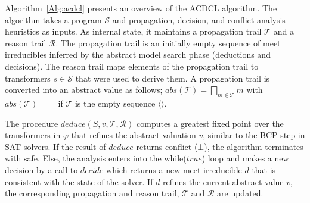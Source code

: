 Algorithm~\ref{Alg:acdcl} presents an overview of the ACDCL algorithm.
The algorithm takes a program $\mathcal{S}$ and propagation, decision,
and conflict analysis heuristics as inputs.  As internal state, it
maintains a propagation trail $\mathcal{T}$ and a reason trail
 $\mathcal{R}$.  The propagation trail is an initially
empty sequence of meet irreducibles inferred by the abstract model
search phase (deductions and decisions). The reason trail maps
 elements of the propagation trail to transformers
$s\in\mathcal{S}$ that were used to derive them. A propagation trail
is converted into an abstract value as follows;
$\mathit{abs}(\mathcal{T})=\bigsqcap_{m \in \mathcal{T}}m$ with
$\mathit{abs}(\mathcal{T})=\top$ if $\mathcal{T}$ is the empty
sequence $\langle\rangle$.

The procedure $deduce(S,v,\mathcal{T},\mathcal{R})$ computes a greatest 
fixed point over the transformers in $\varphi$ that refines the abstract valuation 
$v$, similar to the BCP step in SAT solvers.  If the result of $deduce$ 
returns \textsf{conflict} ($\bot$), the algorithm terminates with \textsf{safe}. 
Else, the analysis enters into the while($true$) loop and makes a new decision 
by a call to $\mathit{decide}$ which returns a new meet irreducible $d$ that is
consistent with the state of the solver.  If $d$ refines the current abstract 
value $v$, the corresponding propagation and reason trail, $\mathcal{T}$ 
and $\mathcal{R}$ are updated. 

